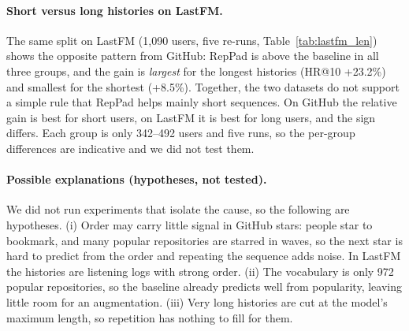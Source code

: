 \documentclass[11pt]{article}
\begin{document}
\begin{table}[t]
\centering\small
{}
\caption{GitHub: HR@10 by history length (mean over 5 re-runs).}
\label{tab:github_len}
\end{table}

\paragraph{Short versus long histories on LastFM.}
The same split on LastFM (1{,}090 users, five re-runs, Table~\ref{tab:lastfm_len}) shows the
opposite pattern from GitHub: RepPad is above the baseline in all three groups, and the
gain is \emph{largest} for the longest histories (HR@10 +23.2\%) and smallest for the shortest
(+8.5\%). Together, the two datasets do not support a simple rule that RepPad helps mainly
short sequences. On GitHub the relative gain is best for short users, on LastFM it is best
for long users, and the sign differs. Each group is only 342--492 users and five
runs, so the per-group differences are indicative and we did not test them.

\begin{table}[t]
\centering\small
{}
\caption{LastFM: HR@10 by history length (mean over 5 re-runs).}
\label{tab:lastfm_len}
\end{table}

\paragraph{Possible explanations (hypotheses, not tested).}
We did not run experiments that isolate the cause, so the following are hypotheses. (i) Order may carry
little signal in GitHub stars: people star to bookmark, and many popular repositories are starred in waves,
so the next star is hard to predict from the order and repeating the sequence adds noise. In LastFM the
histories are listening logs with strong order. (ii) The vocabulary is only 972 popular repositories, so
the baseline already predicts well from popularity, leaving little room for an augmentation. (iii) Very long
histories are cut at the model's maximum length, so repetition has nothing to fill for them.
\end{document}
